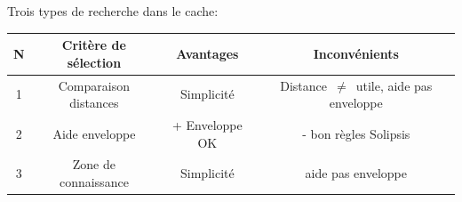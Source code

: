 \documentclass{beamer}
\begin{document}
  \begin{frame}
	Trois types de recherche dans le cache:
	\vspace{7mm}
	\tiny{
	\begin{table}
  		\begin{center}
    		 \begin{tabular}{|c|c|c|c|}
      		 \hline
      		 N & Critère de sélection & Avantages & Inconvénients\\
      		 \hline
        	 1 & Comparaison distances & Simplicité & Distance~$\ne$~utile, aide pas enveloppe\\
        	 2 & Aide enveloppe & + Enveloppe OK & - bon règles Solipsis\\
        	 3 & Zone de connaissance & Simplicité & aide pas enveloppe\\
      		 \hline
    		 \end{tabular}
  		\end{center}
	\end{table}
	}
  \end{frame}
 
  \begin{frame}
  \end{frame}
	
  \begin{frame}	
  \end{frame}
\end{document}

